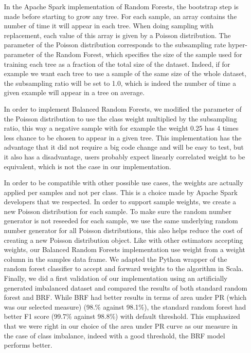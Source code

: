 \documentclass[conference]{IEEEtran}
\begin{document}
In the Apache Spark implementation of Random Forests, the bootstrap step is made before starting to grow any tree. For each sample, an array contains the number of time it will appear in each tree. When doing sampling with replacement, each value of this array is given by a Poisson distribution. The parameter of the Poisson distribution corresponds to the subsampling rate hyper-parameter of the Random Forest, which specifies the size of the sample used for training each tree as a fraction of the total size of the dataset. Indeed, if for example we want each tree to use a sample of the same size of the whole dataset, the subsampling ratio will be set to 1.0, which is indeed the number of time a given example will appear in a tree on average. 

In order to implement Balanced Random Forests, we modified the parameter of the Poisson distribution to use the class weight multiplied by the subsampling ratio, this way a negative sample with for example the weight 0.25 has 4 times less chance to be chosen to appear in a given tree. This implementation has the advantage that it did not require a big code change and will be easy to test, but it also has a disadvantage, users probably expect linearly correlated weight to be equivalent, which is not the case in our implementation.
	
In order to be compatible with other possible use cases, the weights are actually applied per samples and not per class. This is a choice made by Apache Spark developers that we respected. In order to support sample weights, we create a new Poisson distribution for each sample. To make sure the random number generator is not reseeded for each sample, we use the same underlying random number generator for all Poisson distributions, this also helps reduce the cost of creating a new Poisson distribution object.
Like with other estimators accepting weights, our Balanced Random Forests implementation use weight from a weight column in the samples data frame. We adapted the Python wrapper of the random forest classifier to accept and forward weights to the algorithm in Scala. Finally, we did a first validation of our implementation using an artificially generated imbalanced dataset and compared the results of both standard random forest and BRF. While BRF had better results in terms of area under PR (which was our selected measure) (98.\% against 98.1\%), the standard random forest had better F1 score (99.7\% against 98.8\%) with default threshold. This emphasized that we were right in our choice of the area under PR curve as our measure in the case of class imbalance, indeed with a good threshold, the BRF model performs better.
\end{document}
